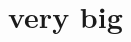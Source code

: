 \documentclass[]{subook}
\begin{document}




        
    
                    
                    
        
% 

\part{very big}
\end{document}
